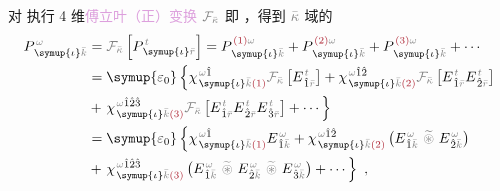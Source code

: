 对  执行 4 维\textcolor{Plum}{傅立叶（正）变换}\cite{xieAnalytic3DVector} $\mathcolor{gray}{\mathcal F_{\bar{\kappa}}}$ 即 ，得到 $\mathcolor{gray}{\bar{\kappa}}$ 域的
\begin{subequations}
\begin{align}
	P^{\;\!\mathcolor{gray}{\omega}}_{\;\! \symup{\iota}\mathcolor{gray}{\bar{k}}} &= \mathcolor{gray}{\mathcal F_{\bar{\kappa}}} \left[ P^{\;\! \mathcolor{gray}{t}}_{\;\! \symup{\iota}\mathcolor{gray}{\bar{r}}} \right] = P^{\;\! \textcolor{Maroon}{(1)} \mathcolor{gray}{\omega}}_{\;\! \symup{\iota}\mathcolor{gray}{\bar{k}}} + P^{\;\! \textcolor{Maroon}{(2)} \mathcolor{gray}{\omega}}_{\;\! \symup{\iota}\mathcolor{gray}{\bar{k}}} + P^{\;\! \textcolor{Maroon}{(3)} \mathcolor{gray}{\omega}}_{\;\! \symup{\iota}\mathcolor{gray}{\bar{k}}} + \cdots \\ &= {\symup{\varepsilon_0}} \left\{ \chi^{\;\! \mathcolor{gray}{\omega} \hat{1}}_{\;\! \symup{\iota} \mathcolor{gray}{\bar{k}} \textcolor{Maroon}{(1)}} \mathcolor{gray}{\mathcal F_{\bar{\kappa}}} \left[ E^{\;\!\mathcolor{gray}{t}}_{\;\! \hat{1} \mathcolor{gray}{\bar{r}}} \right] + \chi^{\;\! \mathcolor{gray}{\omega} \hat{1} \hat{2}}_{\;\! \symup{\iota} \mathcolor{gray}{\bar{k}} \textcolor{Maroon}{(2)}} \mathcolor{gray}{\mathcal F_{\bar{\kappa}}} \left[ E^{\;\!\mathcolor{gray}{t}}_{\;\! \hat{1} \mathcolor{gray}{\bar{r}}} E^{\;\!\mathcolor{gray}{t}}_{\;\! \hat{2} \mathcolor{gray}{\bar{r}}} \right] \right. \label{eq:P_wk} \\ &+ \left. \chi^{\;\! \mathcolor{gray}{\omega} \hat{1} \hat{2} \hat{3}}_{\;\! \symup{\iota} \mathcolor{gray}{\bar{k}} \textcolor{Maroon}{(3)}} \mathcolor{gray}{\mathcal F_{\bar{\kappa}}} \left[ E^{\;\!\mathcolor{gray}{t}}_{\;\! \hat{1} \mathcolor{gray}{\bar{r}}} E^{\;\!\mathcolor{gray}{t}}_{\;\! \hat{2} \mathcolor{gray}{\bar{r}}} E^{\;\!\mathcolor{gray}{t}}_{\;\! \hat{3} \mathcolor{gray}{\bar{r}}} \right] + \cdots \right\}
	\\ &= {\symup{\varepsilon_0}} \left\{ \chi^{\;\! \mathcolor{gray}{\omega} \hat{1}}_{\;\! \symup{\iota} \mathcolor{gray}{\bar{k}} \textcolor{Maroon}{(1)}} E^{\;\!\mathcolor{gray}{\omega}}_{\;\! \hat{1} \mathcolor{gray}{\bar{k}}} + \chi^{\;\! \mathcolor{gray}{\omega} \hat{1} \hat{2}}_{\;\! \symup{\iota} \mathcolor{gray}{\bar{k}} \textcolor{Maroon}{(2)}} \left( E^{\;\!\mathcolor{gray}{\omega}}_{\;\! \hat{1} \mathcolor{gray}{\bar{k}}} ~\mathcolor{gray}{\widetilde \circledast}~ E^{\;\!\mathcolor{gray}{\omega}}_{\;\! \hat{2} \mathcolor{gray}{\bar{k}}} \right) \right. \label{eq:P_wk2} \\ &+ \left. \chi^{\;\! \mathcolor{gray}{\omega} \hat{1} \hat{2} \hat{3}}_{\;\! \symup{\iota} \mathcolor{gray}{\bar{k}} \textcolor{Maroon}{(3)}} \left( E^{\;\!\mathcolor{gray}{\omega}}_{\;\! \hat{1} \mathcolor{gray}{\bar{k}}} ~\mathcolor{gray}{\widetilde \circledast}~ E^{\;\!\mathcolor{gray}{\omega}}_{\;\! \hat{2} \mathcolor{gray}{\bar{k}}} ~\mathcolor{gray}{\widetilde \circledast}~ E^{\;\!\mathcolor{gray}{\omega}}_{\;\! \hat{3} \mathcolor{gray}{\bar{k}}} \right) + \cdots \right\}~,
\end{align}
\end{subequations}
